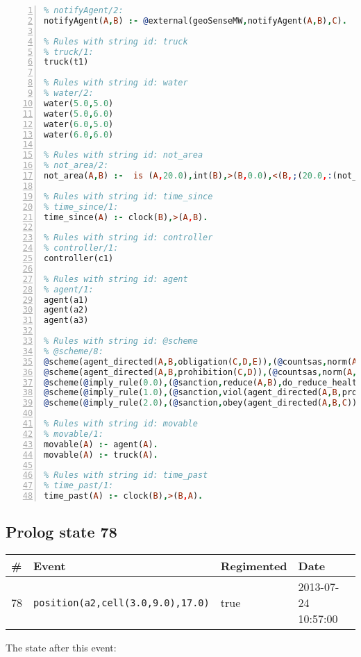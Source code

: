 \documentclass[11pt]{article}\usepackage[utf8]{inputenc}\usepackage{geometry}
\begin{document}
\begin{lstlisting}[language=Prolog, numbers=left]
% Rules with string id: notifyAgent
% notifyAgent/2:
notifyAgent(A,B) :- @external(geoSenseMW,notifyAgent(A,B),C).

% Rules with string id: truck
% truck/1:
truck(t1)

% Rules with string id: water
% water/2:
water(5.0,5.0)
water(5.0,6.0)
water(6.0,5.0)
water(6.0,6.0)

% Rules with string id: not_area
% not_area/2:
not_area(A,B) :-  is (A,20.0),int(B),>(B,0.0),<(B,;(20.0,:(not_area(A,B), is (-(B),20.0)))),int(A),>(A,0.0),<(A,;(20.0,:(area(A,B),-(int(A))))),int(B),>(A,0.0),>(B,0.0),<(A,21.0),<(B,21.0).

% Rules with string id: time_since
% time_since/1:
time_since(A) :- clock(B),>(A,B).

% Rules with string id: controller
% controller/1:
controller(c1)

% Rules with string id: agent
% agent/1:
agent(a1)
agent(a2)
agent(a3)

% Rules with string id: @scheme
% @scheme/8:
@scheme(agent_directed(A,B,obligation(C,D,E)),(@countsas,norm(A,B,F,obligation(C,D,E)),F),false,(listTrue(C)),(time_past(D)),false,[plus(viol(agent_directed(A,B,obligation(C,D,E))))|[]],[plus(obey(agent_directed(A,B,obligation(C,D,E))))|[]])
@scheme(agent_directed(A,B,prohibition(C,D)),(@countsas,norm(A,B,E,prohibition(C,D)),E),(listTrue(C)),false,(false),false,[plus(viol(agent_directed(A,B,prohibition(C,D))))|[]],[plus(obey(agent_directed(A,B,prohibition(C,D))))|[]])
@scheme(@imply_rule(0.0),(@sanction,reduce(A,B),do_reduce_health(A,B),notifyAgent(A,changed(status))),true,false,false,false,[min(reduce(A,B))|[]],[])
@scheme(@imply_rule(1.0),(@sanction,viol(agent_directed(A,B,prohibition(C,D))),do_sanction(D)),true,false,false,false,[min(viol(agent_directed(A,B,prohibition(C,D))))|[]],[])
@scheme(@imply_rule(2.0),(@sanction,obey(agent_directed(A,B,C))),true,false,false,false,[min(obey(agent_directed(A,B,C)))|[]],[])

% Rules with string id: movable
% movable/1:
movable(A) :- agent(A).
movable(A) :- truck(A).

% Rules with string id: time_past
% time_past/1:
time_past(A) :- clock(B),>(B,A).

\end{lstlisting}
\clearpage 
\subsection{Prolog state 78}
\begin{table}[ht]
\centering 
\begin{tabular}{l l l l} 
\textbf{\#} & \textbf{Event} & \textbf{Regimented} & \textbf{Date} \\ [0.5ex] 
\hline
78&\texttt{position(a2,cell(3.0,9.0),17.0)}&true&2013-07-24 10:57:00\\ [1ex] \hline\end{tabular}
\end{table}
The state after this event:
\end{document}
